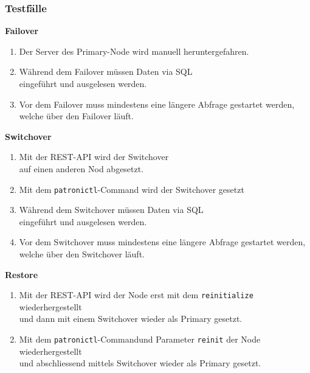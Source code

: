 
\begin{flushleft}
    \subsubsection{Testfälle}
    \begin{description}
        \item \textbf{Failover}\hfill \\
        \begin{enumerate}
            \item Der Server des Primary-Node wird manuell heruntergefahren.
            \item Während dem Failover müssen Daten via SQL\\eingeführt und ausgelesen werden.
            \item Vor dem Failover muss mindestens eine längere Abfrage gestartet werden,\\welche über den Failover läuft.
        \end{enumerate}
        \item \textbf{Switchover}\hfill \\
        \begin{enumerate}[resume]
            \item Mit der REST-API wird der Switchover\\auf einen anderen Nod abgesetzt.
            \item Mit dem \texttt{patronictl}-Command wird der Switchover gesetzt
            \item Während dem Switchover müssen Daten via SQL\\eingeführt und ausgelesen werden.
            \item Vor dem Switchover muss mindestens eine längere Abfrage gestartet werden,\\welche über den Switchover läuft.
        \end{enumerate}
        \item \textbf{Restore}\hfill \\
        \begin{enumerate}[resume]
            \item Mit der REST-API wird der Node erst mit dem \texttt{reinitialize} wiederhergestellt\\und dann mit einem Switchover wieder als Primary gesetzt.
            \item Mit dem \texttt{patronictl}-Commandund Parameter \texttt{reinit} der Node wiederhergestellt\\und abschliessend mittels Switchover wieder als Primary gesetzt.

\end{enumerate}
\end{description}
\end{flushleft}
